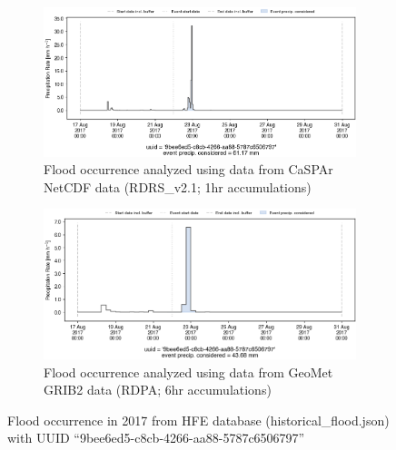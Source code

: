 \documentclass[10pt,a4paper,titlepage,parskip]{scrartcl}
\begin{document}
\begin{figure}[h]
	\begin{subfigure}[a]{1.0\textwidth}
		\centering
		\includegraphics[width=\linewidth]{figures/compare_Geomet_CaSPAr/interpolated_at_stations_occurrence_1686_identified-timesteps_RDRS_v2.1.png}
		\caption{Flood occurrence analyzed using data from CaSPAr NetCDF data (RDRS\_v2.1; 1hr accumulations)}
	\end{subfigure}
	\par\bigskip\bigskip
	\begin{subfigure}[b]{1.0\textwidth}
		\centering
		\includegraphics[width=\linewidth]{figures/compare_Geomet_CaSPAr/interpolated_at_stations_occurrence_1686_identified-timesteps_rdpa_10km_6f.png}
		\caption{Flood occurrence analyzed using data from GeoMet GRIB2 data (RDPA; 6hr accumulations)}
	\end{subfigure}
	\par\bigskip\bigskip
	\caption{Flood occurrence in 2017 from HFE database (historical\_flood.json) with UUID ``9bee6ed5-c8cb-4266-aa88-5787c6506797''}
\end{figure}
\pagebreak
\end{document}
